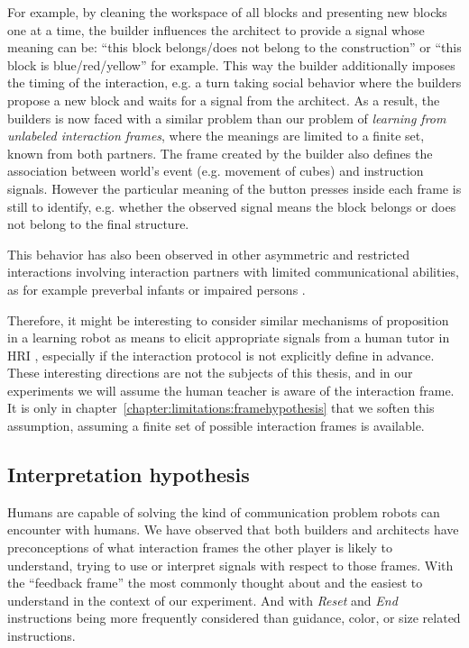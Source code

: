 For example, by cleaning the workspace of all blocks and presenting new blocks one at a time, the builder influences the architect to provide a signal whose meaning can be: ``this block belongs/does not belong to the construction'' or ``this block is blue/red/yellow'' for example. This way the builder additionally imposes the timing of the interaction, e.g. a turn taking social behavior where the builders propose a new block and waits for a signal from the architect. As a result, the builders is now faced with a similar problem than our problem of \emph{learning from unlabeled interaction frames}, where the meanings are limited to a finite set, known from both partners. The frame created by the builder also defines the association between world's event (e.g. movement of cubes) and instruction signals. However the particular meaning of the button presses inside each frame is still to identify, e.g. whether the observed signal means the block belongs or does not belong to the final structure.

This behavior has also been observed in other asymmetric and restricted interactions involving interaction partners with limited communicational abilities, as for example preverbal infants or impaired persons \cite{ochs1979propositions, goodwin1995co}. 

Therefore, it might be interesting to consider similar mechanisms of proposition in a learning robot as means to elicit appropriate signals from a human tutor in HRI \cite{cakmak2012designing,vollmer2014robots,cangelosi2010integration}, especially if the interaction protocol is not explicitly define in advance. These interesting directions are not the subjects of this thesis, and in our experiments we will assume the human teacher is aware of the interaction frame. It is only in chapter~\ref{chapter:limitations:framehypothesis} that we soften this assumption, assuming a finite set of possible interaction frames is available.

\subsection{Interpretation hypothesis}
\label{chapter:humanexperiment:interpretationhypothesis}

Humans are capable of solving the kind of communication problem robots can encounter with humans. We have observed that both builders and architects have preconceptions of what interaction frames the other player is likely to understand, trying to use or interpret signals with respect to those frames. With the ``feedback frame'' the most commonly thought about and the easiest to understand in the context of our experiment. And with \emph{Reset} and \emph{End} instructions being more frequently considered than guidance, color, or size related instructions.


